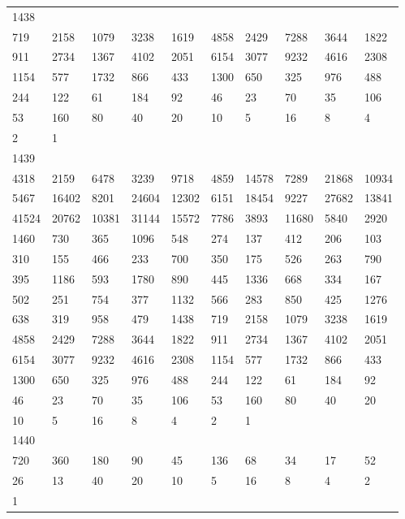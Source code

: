 \begin{longtable}{*{10}{l}}
1438&&&&&&&&&\\
719& 2158& 1079& 3238& 1619& 4858& 2429& 7288& 3644& 1822\\
911& 2734& 1367& 4102& 2051& 6154& 3077& 9232& 4616& 2308\\
1154& 577& 1732& 866& 433& 1300& 650& 325& 976& 488\\
244& 122& 61& 184& 92& 46& 23& 70& 35& 106\\
53& 160& 80& 40& 20& 10& 5& 16& 8& 4\\
2& 1& \\

1439&&&&&&&&&\\
4318& 2159& 6478& 3239& 9718& 4859& 14578& 7289& 21868& 10934\\
5467& 16402& 8201& 24604& 12302& 6151& 18454& 9227& 27682& 13841\\
41524& 20762& 10381& 31144& 15572& 7786& 3893& 11680& 5840& 2920\\
1460& 730& 365& 1096& 548& 274& 137& 412& 206& 103\\
310& 155& 466& 233& 700& 350& 175& 526& 263& 790\\
395& 1186& 593& 1780& 890& 445& 1336& 668& 334& 167\\
502& 251& 754& 377& 1132& 566& 283& 850& 425& 1276\\
638& 319& 958& 479& 1438& 719& 2158& 1079& 3238& 1619\\
4858& 2429& 7288& 3644& 1822& 911& 2734& 1367& 4102& 2051\\
6154& 3077& 9232& 4616& 2308& 1154& 577& 1732& 866& 433\\
1300& 650& 325& 976& 488& 244& 122& 61& 184& 92\\
46& 23& 70& 35& 106& 53& 160& 80& 40& 20\\
10& 5& 16& 8& 4& 2& 1& \\

1440&&&&&&&&&\\
720& 360& 180& 90& 45& 136& 68& 34& 17& 52\\
26& 13& 40& 20& 10& 5& 16& 8& 4& 2\\
1& \\


\end{longtable}
